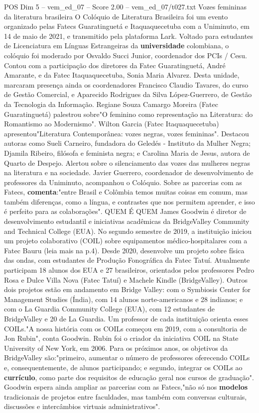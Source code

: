 \begin{textsample}{POS Dim 5 – vem\_ed\_07 – Score 2.00 – vem\_ed\_07/t027.txt}  \label{ex:f5_pos_154}
Vozes femininas da literatura brasileira O Colóquio de Literatura Brasileira foi um evento organizado pelas Fatecs Guaratinguetá e Itaquaquecetuba com a Uniminuto, em 14 de maio de 2021, e transmitido pela plataforma Lark.
Voltado para estudantes de Licenciatura em Línguas Estrangeiras da \textbf{universidade} colombiana, o colóquio foi moderado por Osvaldo Succi Junior, coordenador dos PCIs / Cesu.
Contou com a participação dos diretores da Fatec Guaratinguetá, André Amarante, e da Fatec Itaquaquecetuba, Sonia Maria Alvarez.
Desta unidade, marcaram presença ainda os coordenadores Francisco Claudio Tavares, do curso de Gestão Comercial, e Aparecido Rodrigues da Silva López-Guerrero, de Gestão da Tecnologia da Informação.
Regiane Souza Camargo Moreira (Fatec Guaratinguetá) palestrou sobre"O feminino como representação na Literatura: do Romantismo ao Modernismo".
Wilton Garcia (Fatec Itaquaquecetuba) apresentou"Literatura Contemporânea: vozes negras, vozes femininas".
Destacou autoras como Sueli Carneiro, fundadora do Geledés - Instituto da Mulher Negra; Djamila Ribeiro, filósofa e feminista negra; e Carolina Maria de Jesus, autora de Quarto de Despejo.
Alertou sobre o silenciamento das vozes das mulheres negras na literatura e na sociedade.
Javier Guerrero, coordenador de desenvolvimento de professores da Uniminuto, acompanhou o Colóquio.
Sobre as parcerias com as Fatecs, \textbf{comenta}:"entre Brasil e Colômbia temos muitas coisas em comum, mas também diferenças, como a língua, e contrastes que nos permitem aprender, e isso é perfeito para as colaborações".
QUEM É QUEM James Goodwin é diretor de desenvolvimento estudantil e iniciativas acadêmicas da BridgeValley Community and Technical College (EUA).
No segundo semestre de 2019, a instituição iniciou um projeto colaborativo (COIL) sobre equipamentos médico-hospitalares com a Fatec Bauru (leia mais na p.4).
Desde 2020, desenvolve um projeto sobre física das ondas, com estudantes de Produção Fonográfica da Fatec Tatuí.
Atualmente participam 18 alunos dos EUA e 27 brasileiros, orientados pelos professores Pedro Rosa e Dulce Villa Nova (Fatec Tatuí) e Machele Kindle (BridgeValley).
Outros dois projetos estão em andamento em Bridge Valley: com o Symbiosis Center for Management Studies (Índia), com 14 alunos norte-americanos e 28 indianos; e com o La Guardia Community College (EUA), com 12 estudantes de BridgeValley e 20 de La Guardia.
Um professor de cada instituição orienta esses COILs."A nossa história com os COILs começou em 2019, com a consultoria de Jon Rubin", conta Goodwin.
Rubin foi o criador da iniciativa COIL na State University of New York, em 2006.
Para os próximos anos, os objetivos da BridgeValley são:"primeiro, aumentar o número de professores oferecendo COILs e, consequentemente, de alunos participando; e segundo, integrar os COILs ao \textbf{currículo}, como parte dos requisitos de educação geral nos cursos de graduação".
Goodwin espera ainda ampliar as parcerias com as Fatecs,"não só nos \textbf{modelos} tradicionais de projetos entre faculdades, mas também com conversas culturais, discussões e intercâmbios virtuais administrativos".

\end{textsample}
